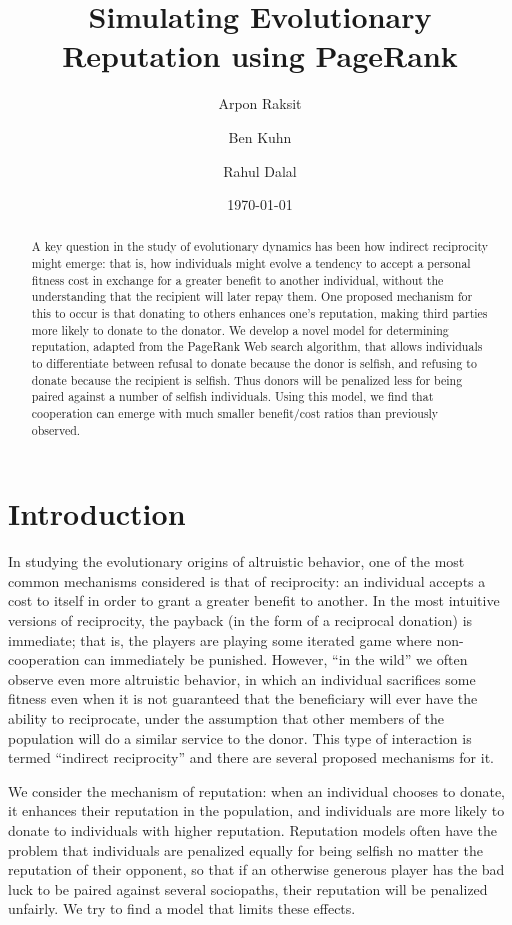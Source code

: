 \documentclass{amsart}
\title{Simulating Evolutionary Reputation using PageRank}
\author{Arpon Raksit \and Ben Kuhn \and Rahul Dalal}
\date{\today}
\begin{document}
\begin{abstract}
A key question in the study of evolutionary dynamics has been how indirect reciprocity might emerge: that is, how individuals might evolve a tendency to accept a personal fitness cost in exchange for a greater benefit to another individual, without the understanding that the recipient will later repay them. One proposed mechanism for this to occur is that donating to others enhances one's reputation, making third parties more likely to donate to the donator. We develop a novel model for determining reputation, adapted from the PageRank Web search algorithm, that allows individuals to differentiate between refusal to donate because the donor is selfish, and refusing to donate because the recipient is selfish. Thus donors will be penalized less for being paired against a number of selfish individuals. Using this model, we find that cooperation can emerge with much smaller benefit/cost ratios than previously observed.
\end{abstract}

\maketitle

\section{Introduction}

In studying the evolutionary origins of altruistic behavior, one of the most common mechanisms considered is that of reciprocity: an individual accepts a cost to itself in order to grant a greater benefit to another. In the most intuitive versions of reciprocity, the payback (in the form of a reciprocal donation) is immediate; that is, the players are playing some iterated game where non-cooperation can immediately be punished. However, ``in the wild'' we often observe even more altruistic behavior, in which an individual sacrifices some fitness even when it is not guaranteed that the beneficiary will ever have the ability to reciprocate, under the assumption that other members of the population will do a similar service to the donor. This type of interaction is termed ``indirect reciprocity'' and there are several proposed mechanisms for it.

We consider the mechanism of reputation: when an individual chooses to donate, it enhances their reputation in the population, and individuals are more likely to donate to individuals with higher reputation. Reputation models often have the problem that individuals are penalized equally for being selfish no matter the reputation of their opponent, so that if an otherwise generous player has the bad luck to be paired against several sociopaths, their reputation will be penalized unfairly. We try to find a model that limits these effects.
\end{document}
